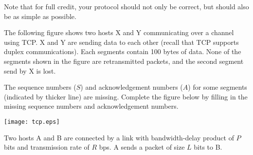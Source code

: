 \documentclass[a4paper,11pt]{exam}
\begin{document}
\begin{questions}
\begin{parts}
Note that for full credit, your protocol should not only be correct, 
but should also be as simple as possible.
\end{parts}

\question
The following figure shows two hosts X and Y communicating over 
a channel using TCP.  X and Y are sending data to each other
(recall that TCP supports duplex communications).  Each segments
contain 100 bytes of data.  None of the segments shown in the 
figure are retransmitted packets, and the second segment send by 
X is lost.

The sequence numbers ($S$) and acknowledgement numbers ($A$) for 
some segments (indicated by thicker line) are missing.  Complete 
the figure below by filling in the missing sequence numbers and 
acknowledgement numbers.

\centerline{
        \texttt{[image: tcp.eps]}
}


\question
Two hosts A and B are connected by a link with bandwidth-delay 
product of $P$ bits and transmission rate of $R$ bps.  A sends 
a packet of size $L$ bits to B.

\end{questions}
\end{document}
